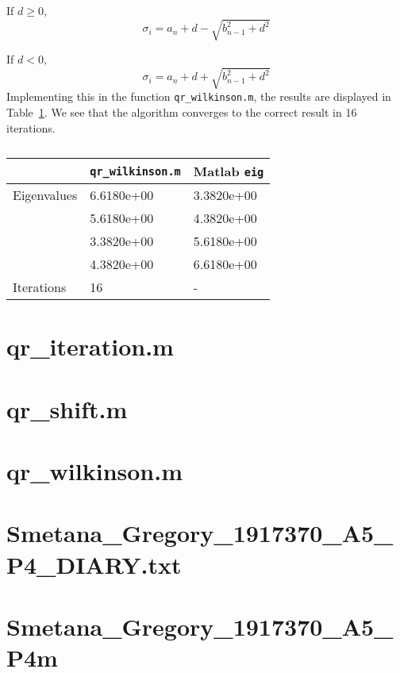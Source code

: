 \documentclass[11pt]{article} %
\begin{document}
 If $d \ge 0$,
\begin{equation}
\sigma_i = a_n + d - \sqrt{b_{n-1}^2 + d^2}
\end{equation}

If $d < 0$,
\begin{equation}
\sigma_i = a_n + d+ \sqrt{b_{n-1}^2 + d^2}
\end{equation}
Implementing this in the function \verb$qr_wilkinson.m$, the results are displayed in Table~\ref{tab:4c}. We see that the algorithm converges to the correct result in 16 iterations.
\begin{table}[h!]
\centering
\begin{tabular}{|l |l | l | } \hline
 &   \verb$qr_wilkinson.m$ & Matlab \verb$eig$ \\ \hline
Eigenvalues   &     6.6180e+00&  3.3820e+00  \\
 &  5.6180e+00 &  4.3820e+00  \\
  & 3.3820e+00   & 5.6180e+00  \\
  &4.3820e+00&  6.6180e+00  \\ \hline
Iterations & 16 &- \\ \hline
\end{tabular}
\caption{}
\label{tab:4c}
\end{table}
\clearpage
\appendix
\section{qr\_iteration.m}

\section{qr\_shift.m}

\section{qr\_wilkinson.m}



\section{Smetana\_Gregory\_1917370\_A5\_P4\_DIARY.txt}


\section{Smetana\_Gregory\_1917370\_A5\_P4m}

\end{document}
